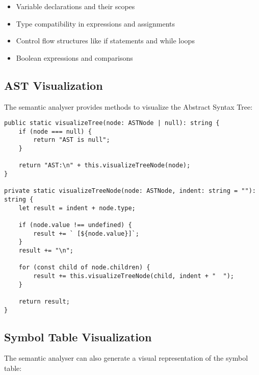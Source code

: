 \documentclass[12pt]{article}
\begin{document}
\begin{itemize}
    \item Variable declarations and their scopes
    \item Type compatibility in expressions and assignments
    \item Control flow structures like if statements and while loops
    \item Boolean expressions and comparisons
\end{itemize}

\subsection{AST Visualization}
The semantic analyser provides methods to visualize the Abstract Syntax Tree:

\begin{lstlisting}
public static visualizeTree(node: ASTNode | null): string {
    if (node === null) {
        return "AST is null";
    }
    
    return "AST:\n" + this.visualizeTreeNode(node);
}

private static visualizeTreeNode(node: ASTNode, indent: string = ""): string {
    let result = indent + node.type;
    
    if (node.value !== undefined) {
        result += ` [${node.value}]`;
    }
    result += "\n";
    
    for (const child of node.children) {
        result += this.visualizeTreeNode(child, indent + "  ");
    }
    
    return result;
}
\end{lstlisting}

\subsection{Symbol Table Visualization}
The semantic analyser can also generate a visual representation of the symbol table:
\end{document}
